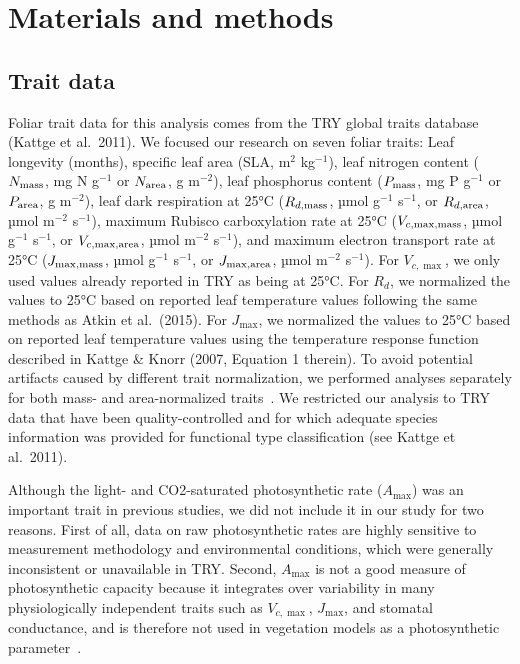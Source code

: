 \section{Materials and methods}\label{sec:mvtraits-methods}

\subsection{Trait data}

Foliar trait data for this analysis comes from the TRY global traits database (Kattge et al.~2011). \nocite{kattge_try_2011}
We focused our research on seven foliar traits:
Leaf longevity (months),
specific leaf area (SLA, m$^2$ kg$^{-1}$),
leaf nitrogen content ($N_{\text{mass}}$, mg N g$^{-1}$ or $N_{\text{area}}$, g m$^{-2}$),
leaf phosphorus content ($P_{\text{mass}}$, mg P g$^{-1}$ or $P_{\text{area}}$, g m$^{-2}$),
leaf dark respiration at 25°C ($R_{d,\text{mass}}$, µmol g$^{-1}$ s$^{-1}$, or $R_{d,\text{area}}$, µmol m$^{-2}$ s$^{-1}$),
maximum Rubisco carboxylation rate at 25°C ($V_{c,\max,\text{mass}}$, µmol g$^{-1}$ s$^{-1}$, or $V_{c,\max,\text{area}}$, µmol m$^{-2}$ s$^{-1}$),
and maximum electron transport rate at 25°C ($J_{\max,\text{mass}}$, µmol g$^{-1}$ s$^{-1}$, or $J_{\max,\text{area}}$, µmol m$^{-2}$ s$^{-1}$).
For $V_{c,\max}$, we only used values already reported in TRY as being at 25°C.
For $R_{d}$, we normalized the values to 25°C based on reported leaf temperature values following the same methods as Atkin et al.~(2015). \nocite{atkin_global_2015}
For $J_{\max}$, we normalized the values to 25°C based on reported leaf temperature values using the temperature response function described in Kattge \& Knorr (2007, Equation 1 therein). \nocite{kattge_2007_temperature}
To avoid potential artifacts caused by different trait normalization, we performed analyses separately for both mass- and area-normalized traits~\cite{osnas_global_2013,lloyd_les}.
We restricted our analysis to TRY data that have been quality-controlled and for which adequate species information was provided for functional type classification (see Kattge et al.~2011).\nocite{kattge_try_2011}

Although the light- and CO2-saturated photosynthetic rate ($A_{\max}$) was an important trait in previous studies, we did not include it in our study for two reasons.
First of all, data on raw photosynthetic rates are highly sensitive to measurement methodology and environmental conditions, which were generally inconsistent or unavailable in TRY\@.
Second, $A_{\max}$ is not a good measure of photosynthetic capacity because it integrates over variability in many physiologically independent traits such as $V_{c,\max}$, $J_{\max}$, and stomatal conductance, and is therefore not used in vegetation models as a photosynthetic parameter~\cite{Ali_2015}.

